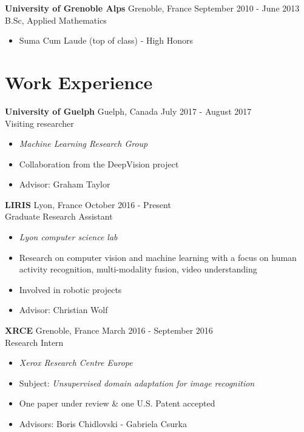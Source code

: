 \documentclass[10pt]{res} %
\begin{document}
\begin{resume}
\textbf{University of Grenoble Alps} \hfill Grenoble, France \hfill September 2010 - June 2013 \\
B.Sc, Applied Mathematics
\begin{itemize}
\item Suma Cum Laude (top of class) - High Honors
\end{itemize}
 

\section{\large Work Experience} 

\textbf{University of Guelph} \hfill Guelph, Canada \hfill July 2017 - August 2017 \\
Visiting researcher
\begin{itemize}
\item \textit{Machine Learning Research Group}
\item Collaboration from the DeepVision project
\item Advisor: Graham Taylor
\end{itemize}

\textbf{LIRIS} \hfill Lyon, France \hfill October 2016 - Present \\
Graduate Research Assistant
\begin{itemize}
\item \textit{Lyon computer science lab}
\item Research on computer vision and machine learning with a focus on human activity recognition, multi-modality fusion, video understanding
\item Involved in robotic projects
\item Advisor: Christian Wolf
\end{itemize}

\textbf{XRCE} \hfill Grenoble, France \hfill March 2016 - September 2016 \\
Research Intern
\begin{itemize}
\item \textit{Xerox Research Centre Europe}
\item Subject: \textit{Unsupervised domain adaptation for image recognition}
\item One paper under review \& one U.S. Patent accepted
\item Advisors: Boris Chidlovski - Gabriela Csurka
\end{itemize}


\end{resume}
\end{document}
